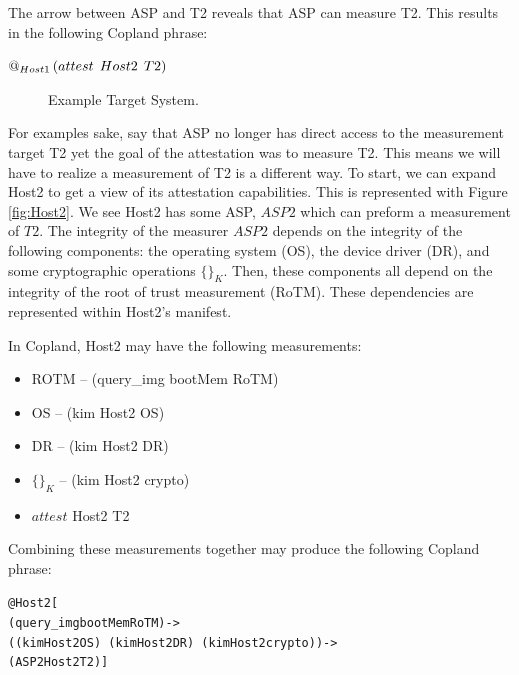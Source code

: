 \documentclass[12pt, letterpaper]{article}
\newcommand{\squash}{\itemsep=0pt\parskip=0pt}
\begin{document}
The arrow between ASP and T2 reveals that ASP can measure T2. This results in the following Copland phrase: 

\begin{center}
  $ \mathop{@_{Host1}}{(}attest\:\: Host2\:\: T2)$
\end{center}

\begin{figure}[hbtp]
  \centering 
  \caption{Example Target System.}
  \label{fig:Host1}
\end{figure}

For examples sake, say that ASP no longer has direct access to the measurement target T2 yet the goal of the attestation was to measure T2. This means we will have to realize a measurement of T2 is a different way. To start, we can expand Host2 to get a view of its attestation capabilities. This is represented with Figure \ref{fig:Host2}. We see Host2 has some ASP, $ASP2$ which can preform a measurement of $T2$. The integrity of the measurer $ASP2$ depends on the integrity of the following components: the operating system (OS), the device driver (DR), and some cryptographic operations $ \{ \}_{K}$. Then, these components all depend on the integrity of the root of trust measurement (RoTM). These dependencies are represented within Host2's manifest. 

In Copland, Host2 may have the following measurements: 

\begin{itemize}
  \squash
  \item ROTM -- (query\_img bootMem RoTM) \cite{Petz::DesignandFormal::2021}
  \item OS -- (kim Host2 OS)
  \item DR -- (kim Host2 DR)
  \item $ \{ \}_{K}$  -- (kim Host2 crypto)
  \item $attest$ Host2 T2
\end{itemize}

Combining these measurements together may produce the following Copland phrase:


\medskip
\begin{alltt}
  @ Host2 [  
    (query\_img bootMem RoTM) ->  
    ((kim Host2 OS) ~ (kim Host2 DR) ~ (kim Host2 crypto)) -> 
    (ASP2 Host2 T2)]
\end{alltt}
\medskip
{}
\end{document}
